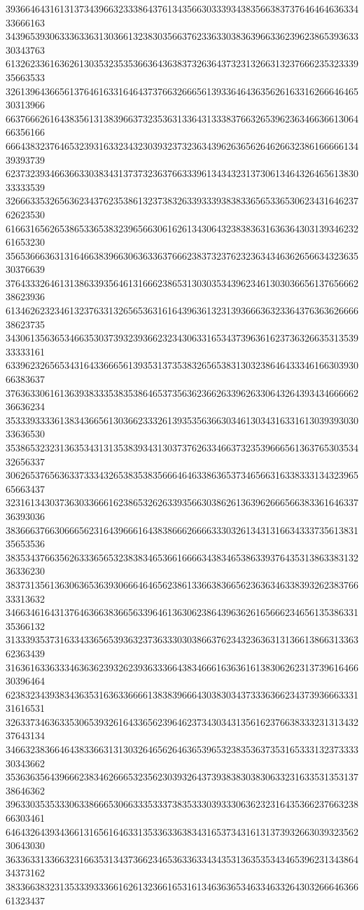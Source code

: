 39366464316131373439663233386437613435663033393438356638373764646463633433666163
34396539306333633631303661323830356637623363303836396633623962386539363330343763
61326233616362613035323535366364363837326364373231326631323766623532333935663533
32613964366561376461633164643737663266656139336464363562616331626664646530313966
66376662616438356131383966373235363133643133383766326539623634663661306466356166
66643832376465323931633234323039323732363439626365626462663238616666613439393739
62373239346636633038343137373236376633396134343231373061346432646561383033333539
32666335326563623437623538613237383263393339383833656533653062343164623762623530
61663165626538653365383239656630616261343064323838363163636430313934623261653230
35653666363131646638396630636336376662383732376232363434636265663432363530376639
37643332646131386339356461316662386531303035343962346130303665613765666238623936
61346262323461323763313265653631616439636132313936663632336437636362666638623735
34306135636534663530373932393662323430633165343739636162373632663531353933333161
63396232656534316433666561393531373538326565383130323864643334616630393066383637
37636330616136393833353835386465373563623662633962633064326439343466666236636234
35333933336138343665613036623332613935356366303461303431633161303939303033636530
35386532323136353431313538393431303737626334663732353966656136376530353432656337
30626537656363373334326538353835666464633863653734656631633833313432396565663437
32316134303736303366616238653262633935663038626136396266656638336164633736393036
38366637663066656231643966616438386662666633303261343131663433373561383135653536
38353437663562633365653238383465366166663438346538633937643531386338313236336230
38373135613630636536393066646465623861336638366562363634633839326238376633313632
34663461643137646366383665633964613630623864396362616566623465613538633135366132
31333935373163343365653936323736333030386637623432363631313661386631336362363439
31636163363334636362393262393633366438346661636361613830626231373961646630396464
62383234393834363531636336666138383966643038303437333636623437393666333131616531
32633734636335306539326164336562396462373430343135616237663833323131343237643134
34663238366464383366313130326465626463653965323835363735316533313237333330343662
35363635643966623834626665323562303932643739383830383063323163353135313738646362
39633035353330633866653066333533373835333039333063623231643536623766323866303461
64643264393436613165616463313533633638343165373431613137393266303932356230643030
36336331336632316635313437366234653633633434353136353534346539623134386434373162
38336638323135333933366162613236616531613463636534633463326430326664636661323437
